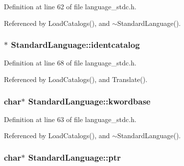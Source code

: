 Definition at line 62 of file language\+\_\+stdc.\+h.



Referenced by Load\+Catalogs(), and $\sim$\+Standard\+Language().

\subsubsection[{\texorpdfstring{identcatalog}{identcatalog}}]{$\ast$ Standard\+Language\+::identcatalog\hspace{0.3cm}{\ttfamily [private]}}\hypertarget{classStandardLanguage_afecc69960bfb65e8658c7bc10d99fd51}{}\label{classStandardLanguage_afecc69960bfb65e8658c7bc10d99fd51}


Definition at line 68 of file language\+\_\+stdc.\+h.



Referenced by Load\+Catalogs(), and Translate().

\subsubsection[{\texorpdfstring{kwordbase}{kwordbase}}]{\setlength{\rightskip}{0pt plus 5cm}char$\ast$ Standard\+Language\+::kwordbase\hspace{0.3cm}{\ttfamily [private]}}\hypertarget{classStandardLanguage_a02ebeba276a3f355b73533eb8a664673}{}\label{classStandardLanguage_a02ebeba276a3f355b73533eb8a664673}


Definition at line 63 of file language\+\_\+stdc.\+h.



Referenced by Load\+Catalogs(), and $\sim$\+Standard\+Language().

\subsubsection[{\texorpdfstring{ptr}{ptr}}]{\setlength{\rightskip}{0pt plus 5cm}char$\ast$ Standard\+Language\+::ptr\hspace{0.3cm}{\ttfamily [private]}}\hypertarget{classStandardLanguage_a4cf91a3b08223744f1ef342b0f98bb3b}{}\label{classStandardLanguage_a4cf91a3b08223744f1ef342b0f98bb3b}


